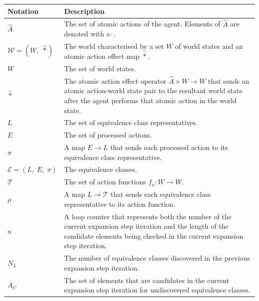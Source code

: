\begin{table}[htbp]
  \begin{fullwidth}
    \centering
    \begin{tabularx}{\linewidth}{lX}
      \toprule
      \textbf{Notation}                    & \textbf{Description} \\
      \midrule
      $\hat{A}$                          & The set of atomic actions of the agent.
      Elements of $\hat{A}$ are denoted with a $\hat{\ }$. \\
      $\mathscr{W} = (W, \; \hat{\ast})$ & The world characterised by a set $W$ of world states and an atomic action effect map $\hat{\ast}$. \\
      $W$                                & The set of world states. \\
      $\hat{\ast}$                       & The atomic action effect operator $\hat{A} \times W \to W$ that sends an atomic action-world state pair to the resultant world state after the agent performs that atomic action in the world state. \\
      $L$                                & The set of equivalence class representatives. \\
      $E$                                & The set of processed actions. \\
      $\pi$                              & A map $E \to L$ that sends each processed action to its equivalence class representative. \\
      $\mathcal{E} = (L, \; E, \; \pi)$  & The equivalence classes. \\
      $\mathcal{T}$                      & The set of action functions $f_{a}: W \to W$. \\
      $\rho$                             & A map $L \to \mathcal{T}$ that sends each equivalence class representative to its action function. \\
      $n$                                & A loop counter that represents both the number of the current expansion step iteration and the length of the candidate elements being checked in the current expansion step iteration. \\
      $N_{L}$                            & The number of equivalence classes discovered in the previous expansion step iteration. \\
      $A_{C}$                            & The set of elements that are candidates in the current expansion step iteration for undiscovered equivalence classes. \\

\end{tabularx}
\end{fullwidth}
\end{table}
